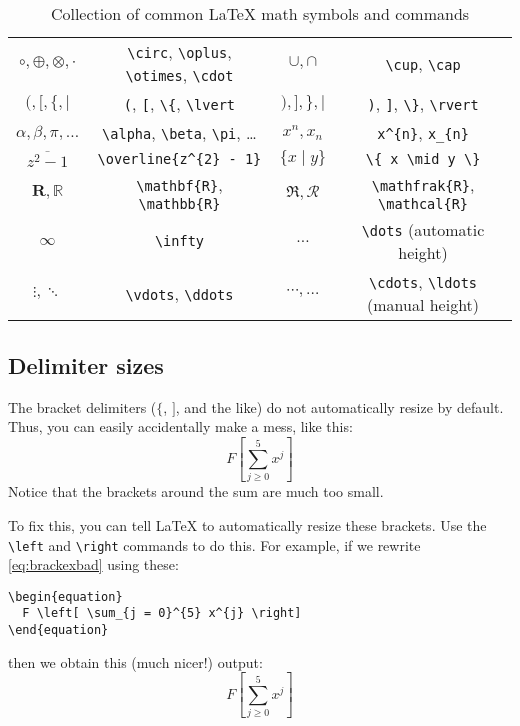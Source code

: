 \documentclass{article}
\newcommand*{\code}[1]{\texttt{#1}}
\begin{document}
\begin{table}[htb]
\begin{tabular}[htb]{c c c c}
  $\circ, \oplus, \otimes, \cdot$ & \code{\textbackslash{}circ}, \code{\textbackslash{}oplus}, \code{\textbackslash{}otimes}, \code{\textbackslash{}cdot} & $\cup, \cap$ & \code{\textbackslash{}cup}, \code{\textbackslash{}cap} \\
  $(, [, \{, \lvert$ & \code{(}, \code{[}, \code{\textbackslash{}\{}, \code{\textbackslash{}lvert} & $), ], \}, \rvert$ & \code{)}, \code{]}, \code{\textbackslash{}\}}, \code{\textbackslash{}rvert} \\
  $\alpha, \beta, \pi, \dots$ & \code{\textbackslash{}alpha}, \code{\textbackslash{}beta}, \code{\textbackslash{}pi}, \dots & $x^{n}, x_{n}$ & \code{x\textasciicircum{}\{n\}}, \code{x\_\{n\}} \\
  $\overline{z^{2} - 1}$ & \code{\textbackslash{}overline\{z\textasciicircum{}\{2\} - 1\}} & $\{ x \mid y \}$ & \code{\textbackslash{}\{ x \textbackslash{}mid y \textbackslash{}\}} \\
  $\mathbf{R}, \mathbb{R}$ & \code{\textbackslash{}mathbf\{R\}}, \code{\textbackslash{}mathbb\{R\}} & $\mathfrak{R}, \mathcal{R}$ & \code{\textbackslash{}mathfrak\{R\}}, \code{\textbackslash{}mathcal\{R\}} \\
  $\infty$ & \code{\textbackslash{}infty} & $\dots$ & \code{\textbackslash{}dots} (automatic height) \\
  $\vdots, \ddots$ & \code{\textbackslash{}vdots}, \code{\textbackslash{}ddots} & $\cdots, \ldots$ & \code{\textbackslash{}cdots}, \code{\textbackslash{}ldots} (manual height) \\
 \bottomrule
\end{tabular}
\caption{Collection of common \LaTeX{} math symbols and commands}
\label{tab:comsymb}
\end{table}

\subsection*{Delimiter sizes}
The bracket delimiters ($\{$, $]$, and the like) do not automatically resize by default.
Thus, you can easily accidentally make a mess, like this:
\begin{equation}
  \label{eq:brackexbad}
  F [ \sum_{j \geq 0}^{5} x^{j} ]
\end{equation}
Notice that the brackets around the sum are much too small.

To fix this, you can tell \LaTeX{} to automatically resize these brackets.
Use the \code{\textbackslash{}left} and \code{\textbackslash{}right} commands to do this.
For example, if we rewrite \cref{eq:brackexbad} using these:
\begin{verbatim}
\begin{equation}
  F \left[ \sum_{j = 0}^{5} x^{j} \right]
\end{equation}
\end{verbatim}
then we obtain this (much nicer!) output:
\begin{equation}
  \label{eq:brackexgood}
  F \left[ \sum_{j \geq 0}^{5} x^{j} \right]
\end{equation}
\end{document}
